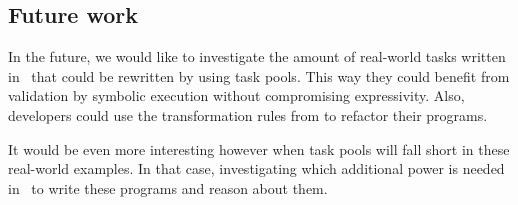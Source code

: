 \subsection{Future work}
\label{sec:future-work}

In the future, we would like to investigate the amount of real-world tasks written in \ITASKS\ that could be rewritten by using task pools.
This way they could benefit from validation by symbolic execution without compromising expressivity.
Also, developers could use the transformation rules from \citet{conf/sfp/KlijnsmaS22} to refactor their programs.

It would be even more interesting however when task pools will fall short in these real-world examples.
In that case, investigating which additional power is needed in \TOPHAT\ to write these programs and reason about them.